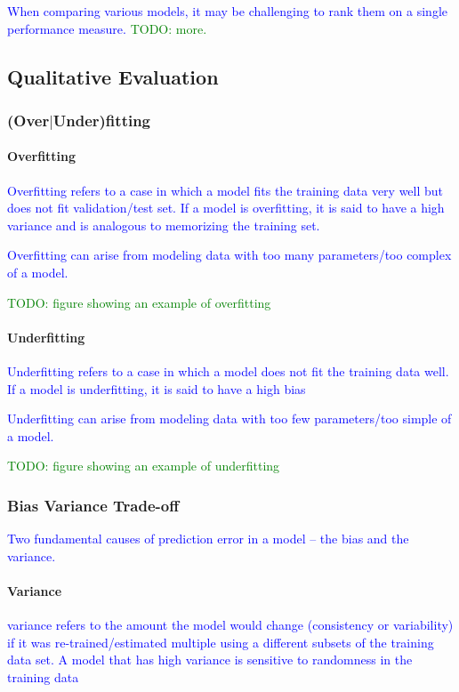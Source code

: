 \textcolor{blue}{When comparing various models, it may be challenging to rank them on a single performance measure. \textcolor{green}{TODO: more.}}

\subsection{Qualitative Evaluation}

\subsubsection{(Over$|$Under)fitting}

\paragraph{Overfitting}

\textcolor{blue}{Overfitting refers to a case in which a model fits the training data very well but does not fit validation/test set. If a model is overfitting, it is said to have a high variance and is analogous to memorizing the training set.}

\textcolor{blue}{Overfitting can arise from modeling data with too many parameters/too complex of a model.}

\textcolor{green}{TODO: figure showing an example of overfitting}

\paragraph{Underfitting}

\textcolor{blue}{Underfitting refers to a case in which a model does not fit the training data well. If a model is underfitting, it is said to have a high bias}

\textcolor{blue}{Underfitting can arise from modeling data with too few parameters/too simple of a model.}

\textcolor{green}{TODO: figure showing an example of underfitting}


\subsubsection{Bias Variance Trade-off}

\textcolor{blue}{Two fundamental causes of prediction error in a model -- the bias and the variance.}

\paragraph{Variance}
\textcolor{blue}{variance refers to the amount the model would change (consistency or variability) if it was re-trained/estimated multiple using a different subsets of the training data set. A model that has high variance is sensitive to randomness in the training data}

